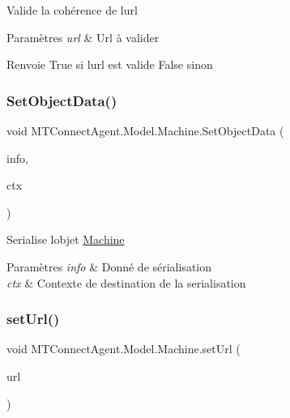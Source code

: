Valide la cohérence de l\textquotesingle{}url


\begin{DoxyParams}{Paramètres}
{\em url} & Url à valider\\
\hline
\end{DoxyParams}
\begin{DoxyReturn}{Renvoie}
True si l\textquotesingle{}url est valide False sinon
\end{DoxyReturn}
\mbox{\label{class_m_t_connect_agent_1_1_model_1_1_machine_a6fca01ab63360a7ba3ae89772d9e9c48}} 
\subsubsection{\texorpdfstring{Set\+Object\+Data()}{SetObjectData()}}
{\footnotesize\ttfamily void M\+T\+Connect\+Agent.\+Model.\+Machine.\+Set\+Object\+Data (\begin{DoxyParamCaption}\item[{Serialization\+Info}]{info,  }\item[{Streaming\+Context}]{ctx }\end{DoxyParamCaption})\hspace{0.3cm}{\ttfamily [inline]}}



Serialise l\textquotesingle{}objet \mbox{\hyperlink{class_m_t_connect_agent_1_1_model_1_1_machine}{Machine}} 


\begin{DoxyParams}{Paramètres}
{\em info} & Donné de sérialisation\\
\hline
{\em ctx} & Contexte de destination de la serialisation\\
\hline
\end{DoxyParams}
\mbox{\label{class_m_t_connect_agent_1_1_model_1_1_machine_a06ffd7e8b7adb8b7306b0bc2a6662fb9}} 
\subsubsection{\texorpdfstring{set\+Url()}{setUrl()}}
{\footnotesize\ttfamily void M\+T\+Connect\+Agent.\+Model.\+Machine.\+set\+Url (\begin{DoxyParamCaption}\item[{string}]{url }\end{DoxyParamCaption})\hspace{0.3cm}{\ttfamily [inline]}}



